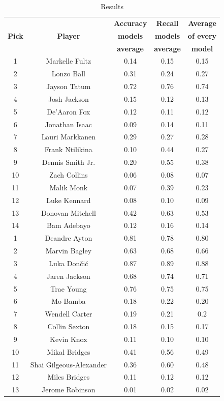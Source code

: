 \documentclass[a4paper]{article}
\begin{document}
\begin{table}[!h] %
\begin{center}
\begin{tabular}{|c|c|c|c|c|} \hline
\textbf{ } & \textbf{ } & \textbf{Accuracy} & \textbf{Recall} & \textbf{Average} \\
\textbf{Pick} & \textbf{Player} & \textbf{models} & \textbf{models} & \textbf{of every} \\
\textbf{ } & \textbf{ } & \textbf{average} & \textbf{average} & \textbf{model} \\ \hline
1 & Markelle Fultz & 0.14 & 0.15 & 0.15 \\ \hline
2 & Lonzo Ball & 0.31 & 0.24 & 0.27 \\ \hline
3 & Jayson Tatum & 0.72 & 0.76 & 0.74 \\ \hline
4 & Josh Jackson & 0.15 & 0.12 & 0.13 \\ \hline
5 & De'Aaron Fox & 0.12 & 0.11 & 0.12 \\ \hline
6 & Jonathan Isaac & 0.09 & 0.14 & 0.11 \\ \hline
7 & Lauri Markkanen & 0.29 & 0.27 & 0.28 \\ \hline
8 & Frank Ntilikina & 0.10 & 0.44 & 0.27 \\ \hline
9 & Dennis Smith Jr. & 0.20 & 0.55 & 0.38 \\ \hline
10 & Zach Collins & 0.06 & 0.08 & 0.07 \\ \hline
11 & Malik Monk & 0.07 & 0.39 & 0.23 \\ \hline
12 & Luke Kennard & 0.08 & 0.10 & 0.09 \\ \hline
13 & Donovan Mitchell & 0.42 & 0.63 & 0.53 \\ \hline
14 & Bam Adebayo & 0.12 & 0.16 & 0.14 \\ \hline
1 & Deandre Ayton & 0.81 & 0.78 & 0.80 \\ \hline
2 & Marvin Bagley & 0.63 & 0.68 & 0.66 \\ \hline
3 & Luka Dončić & 0.87 & 0.89 & 0.88 \\ \hline
4 & Jaren Jackson & 0.68 & 0.74 & 0.71 \\ \hline
5 & Trae Young & 0.76 & 0.75 & 0.75 \\ \hline
6 & Mo Bamba & 0.18 & 0.22 & 0.20 \\ \hline
7 & Wendell Carter & 0.19 & 0.21 & 0.2 \\ \hline
8 & Collin Sexton & 0.18 & 0.15 & 0.17 \\ \hline
9 & Kevin Knox & 0.11 & 0.10 & 0.10 \\ \hline
10 & Mikal Bridges & 0.41 & 0.56 & 0.49 \\ \hline
11 & Shai Gilgeous-Alexander & 0.36 & 0.60 & 0.48 \\ \hline
12 & Miles Bridges & 0.11 & 0.12 & 0.12 \\ \hline
13 & Jerome Robinson & 0.01 & 0.02 & 0.02 \\ \hline
\end{tabular}
\caption{Results}
\label{tab:results_all_star}
\end{center}
\end{table}
\end{document}
